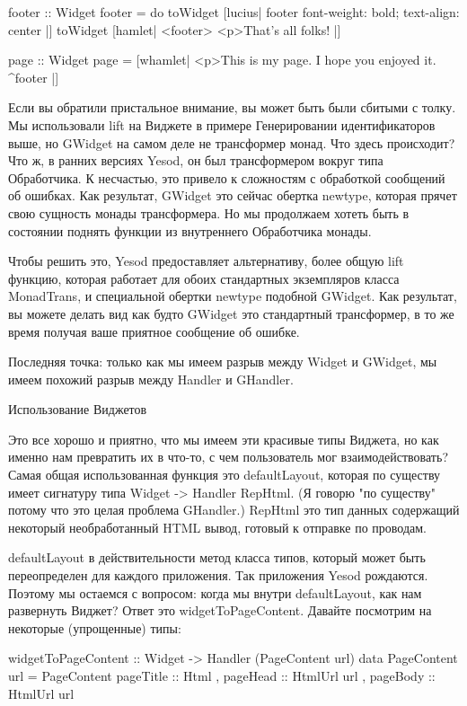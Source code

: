 footer :: Widget
footer = do
    toWidget [lucius| footer { font-weight: bold; text-align: center } |]
    toWidget [hamlet|
<footer>
    <p>That's all folks!
|]

page :: Widget
page = [whamlet|
<p>This is my page. I hope you enjoyed it.
^{footer}
|]

Если вы обратили пристальное внимание, вы может быть были сбитыми с толку. Мы использовали lift на Виджете в примере Генерировании идентификаторов выше, но GWidget на самом деле не трансформер монад. Что здесь происходит? Что ж, в ранних версиях Yesod, он был трансформером вокруг типа Обработчика. К несчастью, это привело к сложностям с обработкой сообщений об ошибках. Как результат, GWidget это сейчас обертка newtype, которая прячет свою сущность монады трансформера. Но мы продолжаем хотеть быть в состоянии поднять функции из внутреннего Обработчика монады.

Чтобы решить это, Yesod предоставляет альтернативу, более общую lift функцию, которая работает для обоих стандартных экземпляров класса MonadTrans, и специальной обертки newtype подобной GWidget. Как результат, вы можете делать вид как будто GWidget это стандартный трансформер, в то же время получая ваше приятное сообщение об ошибке.

Последняя точка: только как мы имеем разрыв между Widget и GWidget, мы имеем похожий разрыв между Handler и GHandler.

Использование Виджетов

Это все хорошо и приятно, что мы имеем эти красивые типы Виджета, но как именно нам превратить их в что-то, с чем пользователь мог взаимодействовать? Самая общая использованная функция это defaultLayout, которая по существу имеет сигнатуру типа Widget -> Handler RepHtml. (Я говорю "по существу" потому что это целая проблема GHandler.) RepHtml это тип данных содержащий некоторый необработанный HTML вывод, готовый к отправке по проводам.

defaultLayout в действительности метод класса типов, который может быть переопределен для каждого приложения. Так приложения Yesod рождаются. Поэтому мы остаемся с вопросом: когда мы внутри defaultLayout, как нам развернуть Виджет? Ответ это widgetToPageContent. Давайте посмотрим на некоторые (упрощенные) типы: 

widgetToPageContent :: Widget -> Handler (PageContent url)
data PageContent url = PageContent
    { pageTitle :: Html
    , pageHead :: HtmlUrl url
    , pageBody :: HtmlUrl url
    } 

